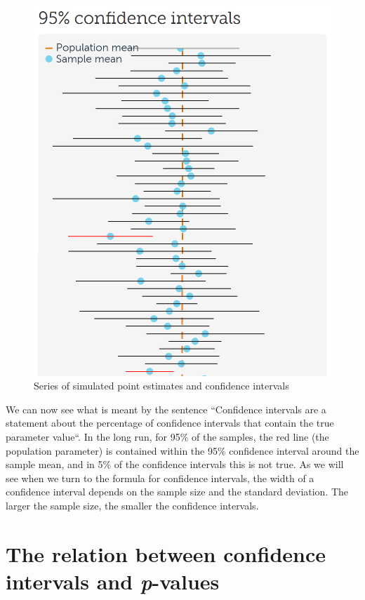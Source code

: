 \documentclass[
  oneside]{book}
\begin{document}
\begin{figure}

{\centering \includegraphics[width=1\linewidth]{images/cisim} 

}

\caption{Series of simulated point estimates and confidence intervals}\label{fig:cisim}
\end{figure}

We can now see what is meant by the sentence ``Confidence intervals are a statement about the percentage of confidence intervals that contain the true parameter value``. In the long run, for 95\% of the samples, the red line (the population parameter) is contained within the 95\% confidence interval around the sample mean, and in 5\% of the confidence intervals this is not true. As we will see when we turn to the formula for confidence intervals, the width of a confidence interval depends on the sample size and the standard deviation. The larger the sample size, the smaller the confidence intervals.

\hypertarget{relatCIp}{%
\section{\texorpdfstring{The relation between confidence intervals and \emph{p}-values}{The relation between confidence intervals and p-values}}\label{relatCIp}}
\end{document}
